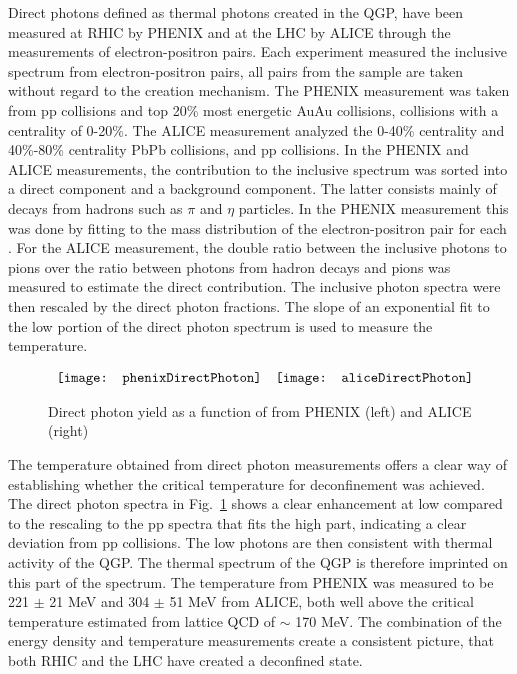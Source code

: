       Direct photons defined as thermal photons created in the QGP, have been 
        measured at RHIC by PHENIX \cite{phenixPhoton2010} and at the LHC by ALICE 
        \cite{photonALICE} through the measurements of electron-positron pairs.
      Each experiment measured the inclusive \pt{} spectrum from 
        electron-positron pairs, all pairs from the sample are taken without
        regard to the creation mechanism.
      The PHENIX measurement was taken from pp collisions and top 20\% most 
        energetic AuAu collisions, collisions with a centrality of 0-20\%. 
      The ALICE measurement analyzed the 0-40\% centrality and 40\%-80\% centrality
        PbPb collisions, and pp collisions. 
      In the PHENIX and ALICE measurements, the contribution to the inclusive 
        spectrum was sorted into a direct component and a background component.
      The latter consists mainly of decays from hadrons such as $\pi$ and $\eta$
        particles. 
      In the PHENIX measurement this was done by fitting to the mass 
        distribution of the electron-positron pair for each \pt{}.
      For the ALICE measurement, the double ratio between the inclusive photons 
        to pions over the ratio between photons from hadron decays and pions was
        measured to estimate the direct contribution. 
      The inclusive photon \pt{} spectra were then rescaled by the direct 
        photon fractions.
      The slope of an exponential fit to the low \pt{} portion of the direct 
        photon spectrum is used to measure the temperature.
      \begin{figure}[!Hhbt]
        \centering
        $ \begin{array}{c c}
          \texttt{[image: phenixDirectPhoton]} &
          \texttt{[image: aliceDirectPhoton]}
        \end{array} $
        \caption{Direct photon yield as a function of \pt{} from 
          PHENIX \cite{phenixPhoton2010} (left) and ALICE \cite{photonALICE} 
          (right)}
        \label{fig:directPhotonPt}
      \end{figure}
  
      The temperature obtained from direct photon measurements offers a clear
        way of establishing whether the critical temperature for deconfinement
        was achieved. 
      The direct photon \pt{} spectra in Fig.~\ref{fig:directPhotonPt} shows a 
        clear enhancement at low \pt{} compared to the rescaling to the pp 
        spectra that fits the high \pt{} part, indicating a clear deviation from 
        pp collisions.
      The low \pt{} photons are then consistent with thermal activity of
        the QGP.
      The thermal spectrum of the QGP is therefore imprinted on this part of 
        the spectrum.
      The temperature from PHENIX was measured to be 221 $\pm$ 21 MeV and 
        304 $\pm$ 51 MeV from ALICE, both well above the critical temperature
        estimated from lattice QCD of $\sim$ 170 MeV.
      The combination of the energy density and temperature measurements
        create a consistent picture, that both RHIC and the LHC have created a 
        deconfined state.

